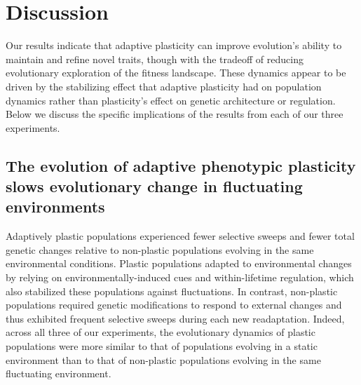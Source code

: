 
\section{Discussion}

Our results indicate that adaptive plasticity can improve evolution's ability to maintain and refine novel traits, though with the tradeoff of reducing evolutionary exploration of the fitness landscape.
These dynamics appear to be driven by the stabilizing effect that adaptive plasticity had on population dynamics rather than plasticity's effect on genetic architecture or regulation.
Below we discuss the specific implications of the results from each of our three experiments.

\subsection{The evolution of adaptive phenotypic plasticity slows evolutionary change in fluctuating environments}

Adaptively plastic populations experienced fewer selective sweeps and fewer total genetic changes relative to non-plastic populations evolving in the same environmental conditions.
Plastic populations adapted to environmental changes by relying on environmentally-induced cues and within-lifetime regulation, which also stabilized these populations against fluctuations. 
In contrast, non-plastic populations required genetic modifications to respond to external changes and thus exhibited frequent selective sweeps during each new readaptation.
Indeed, across all three of our experiments, the evolutionary dynamics of plastic populations were more similar to that of populations evolving in a static environment than to that of non-plastic populations evolving in the same fluctuating environment.


